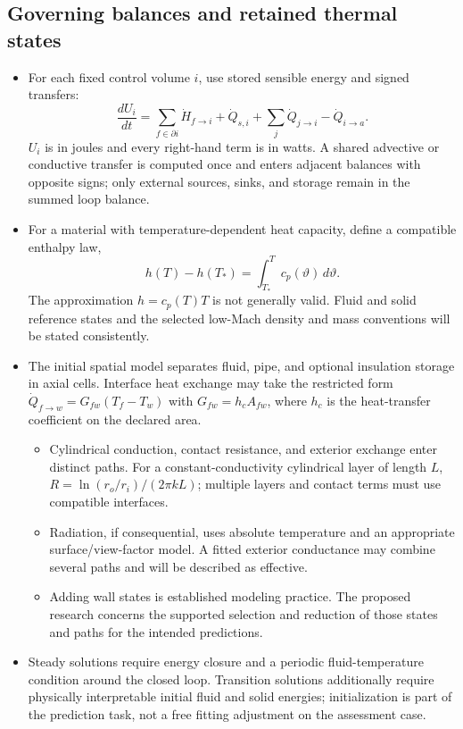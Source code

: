 \subsection{Governing balances and retained thermal states}\label{subsec:governing-balances}
\begin{itemize}[leftmargin=*]
\item For each fixed control volume $i$, use stored sensible energy and signed transfers:
\begin{equation}
\frac{dU_i}{dt}=\sum_{f\in\partial i}\dot H_{f\to i}
+\dot Q_{s,i}+\sum_j\dot Q_{j\to i}-\dot Q_{i\to a}.
\label{eq:conservative-energy}
\end{equation}
$U_i$ is in joules and every right-hand term is in watts. A shared advective or conductive transfer is computed once and enters adjacent balances with opposite signs; only external sources, sinks, and storage remain in the summed loop balance.
\item For a material with temperature-dependent heat capacity, define a compatible enthalpy law,
\begin{equation}
h(T)-h(T_*)=\int_{T_*}^{T}c_p(\vartheta)\,d\vartheta.
\label{eq:enthalpy-law}
\end{equation}
The approximation $h=c_p(T)T$ is not generally valid. Fluid and solid reference states and the selected low-Mach density and mass conventions will be stated consistently.\cite{sohal2010engineering}
\item The initial spatial model separates fluid, pipe, and optional insulation storage in axial cells. Interface heat exchange may take the restricted form $\dot Q_{f\to w}=G_{fw}(T_f-T_w)$ with $G_{fw}=h_c A_{fw}$, where $h_c$ is the heat-transfer coefficient on the declared area.
\begin{itemize}
\item Cylindrical conduction, contact resistance, and exterior exchange enter distinct paths. For a constant-conductivity cylindrical layer of length $L$, $R=\ln(r_o/r_i)/(2\pi kL)$; multiple layers and contact terms must use compatible interfaces.
\item Radiation, if consequential, uses absolute temperature and an appropriate surface/view-factor model. A fitted exterior conductance may combine several paths and will be described as effective.
\item Adding wall states is established modeling practice. The proposed research concerns the supported selection and reduction of those states and paths for the intended predictions.\cite{dass2018cncl,borgohain2011naturalcirculation,cammi2016wallinertia}
\end{itemize}
\item Steady solutions require energy closure and a periodic fluid-temperature condition around the closed loop. Transition solutions additionally require physically interpretable initial fluid and solid energies; initialization is part of the prediction task, not a free fitting adjustment on the assessment case.
\end{itemize}

